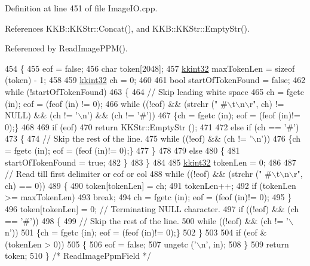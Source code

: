 Definition at line 451 of file Image\+I\+O.\+cpp.



References K\+K\+B\+::\+K\+K\+Str\+::\+Concat(), and K\+K\+B\+::\+K\+K\+Str\+::\+Empty\+Str().



Referenced by Read\+Image\+P\+P\+M().


\begin{DoxyCode}
454 \{
455   eof = \textcolor{keyword}{false};
456   \textcolor{keywordtype}{char}  token[2048];
457   \hyperlink{namespace_k_k_b_a8fa4952cc84fda1de4bec1fbdd8d5b1b}{kkint32}  maxTokenLen = \textcolor{keyword}{sizeof} (token) - 1;
458 
459   \hyperlink{namespace_k_k_b_a8fa4952cc84fda1de4bec1fbdd8d5b1b}{kkint32}  ch = 0;
460 
461   \textcolor{keywordtype}{bool}  startOfTokenFound = \textcolor{keyword}{false};
462   \textcolor{keywordflow}{while}  (!startOfTokenFound)
463   \{
464     \textcolor{comment}{// Skip leading white space}
465     ch = fgetc (in);  eof = (feof (in) != 0);
466     \textcolor{keywordflow}{while}  ((!eof)  &&  (strchr (\textcolor{stringliteral}{" #\(\backslash\)t\(\backslash\)n\(\backslash\)r"}, ch) != NULL)  &&  (ch != \textcolor{charliteral}{'\(\backslash\)n'})  &&  (ch != \textcolor{charliteral}{'#'}))
467       \{ch = fgetc (in); eof = (feof (in)!= 0);\}
468 
469     \textcolor{keywordflow}{if}  (eof)  
470       \textcolor{keywordflow}{return} KKStr::EmptyStr ();
471 
472     \textcolor{keywordflow}{else} \textcolor{keywordflow}{if}  (ch == \textcolor{charliteral}{'#'})
473     \{
474       \textcolor{comment}{// Skip the rest of the line.}
475       \textcolor{keywordflow}{while}  ((!eof)  &&  (ch != \textcolor{charliteral}{'\(\backslash\)n'}))
476         \{ch = fgetc (in); eof = (feof (in)!= 0);\}
477     \}
478 
479     \textcolor{keywordflow}{else}
480     \{
481       startOfTokenFound = \textcolor{keyword}{true};
482     \}
483   \}
484 
485   \hyperlink{namespace_k_k_b_a8fa4952cc84fda1de4bec1fbdd8d5b1b}{kkint32} tokenLen = 0;
486 
487   \textcolor{comment}{// Read till first delimiter or eof or eol}
488   \textcolor{keywordflow}{while}  ((!eof)  &&  (strchr (\textcolor{stringliteral}{" #\(\backslash\)t\(\backslash\)n\(\backslash\)r"}, ch) == 0))
489   \{
490     token[tokenLen] = ch;
491     tokenLen++;
492     \textcolor{keywordflow}{if}  (tokenLen >= maxTokenLen)
493       \textcolor{keywordflow}{break};
494     ch = fgetc (in); eof = (feof (in)!= 0);
495   \}
496   token[tokenLen] = 0;  \textcolor{comment}{// Terminating NULL character.}
497   \textcolor{keywordflow}{if}  ((!eof)  &&  (ch == \textcolor{charliteral}{'#'}))
498   \{
499     \textcolor{comment}{// Skip the rest of the line.}
500     \textcolor{keywordflow}{while}  ((!eof)  &&  (ch != \textcolor{charliteral}{'\(\backslash\)n'}))
501       \{ch = fgetc (in); eof = (feof (in)!= 0);\}
502   \}
503 
504   \textcolor{keywordflow}{if}  (eof  &  (tokenLen > 0))
505   \{
506     eof = \textcolor{keyword}{false};
507     ungetc (\textcolor{charliteral}{'\(\backslash\)n'}, in);
508   \}
509   \textcolor{keywordflow}{return}  token;
510 \}  \textcolor{comment}{/* ReadImagePpmField */}
\end{DoxyCode}
